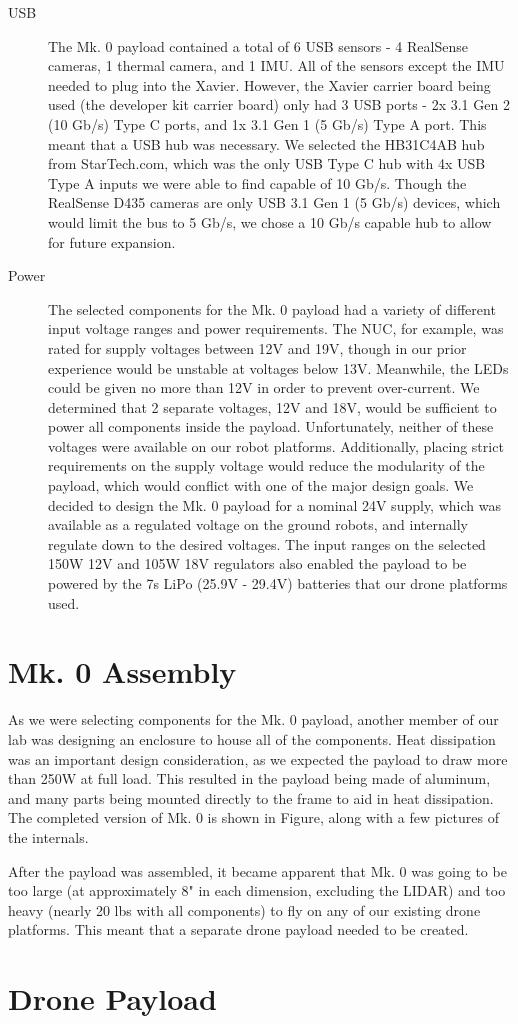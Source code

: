 \begin{description}
	\item[USB] The Mk. 0 payload contained a total of 6 USB sensors - 4 RealSense cameras, 1 thermal camera, and 1 IMU. All of the sensors except the IMU needed to plug into the Xavier. However, the Xavier carrier board being used (the developer kit carrier board) only had 3 USB ports - 2x 3.1 Gen 2 (10 Gb/s) Type C ports, and 1x 3.1 Gen 1 (5 Gb/s) Type A port. This meant that a USB hub was necessary. We selected the HB31C4AB hub from StarTech.com, which was the only USB Type C hub with 4x USB Type A inputs we were able to find capable of 10 Gb/s. Though the RealSense D435 cameras are only USB 3.1 Gen 1 (5 Gb/s) devices, which would limit the bus to 5 Gb/s, we chose a 10 Gb/s capable hub to allow for future expansion.
	
	\item[Power] The selected components for the Mk. 0 payload had a variety of different input voltage ranges and power requirements. The NUC, for example, was rated for supply voltages between 12V and 19V, though in our prior experience would be unstable at voltages below 13V. Meanwhile, the LEDs could be given no more than 12V in order to prevent over-current. We determined that 2 separate voltages, 12V and 18V, would be sufficient to power all components inside the payload. Unfortunately, neither of these voltages were available on our robot platforms. Additionally, placing strict requirements on the supply voltage would reduce the modularity of the payload, which would conflict with one of the major design goals. We decided to design the Mk. 0 payload for a nominal 24V supply, which was available as a regulated voltage on the ground robots, and internally regulate down to the desired voltages. The input ranges on the selected 150W 12V and 105W 18V regulators also enabled the payload to be powered by the 7s LiPo (25.9V - 29.4V) batteries that our drone platforms used.
	
\end{description}

\section{Mk. 0 Assembly}

As we were selecting components for the Mk. 0 payload, another member of our lab was designing an enclosure to house all of the components. Heat dissipation was an important design consideration, as we expected the payload to draw more than 250W at full load. This resulted in the payload being made of aluminum, and many parts being mounted directly to the frame to aid in heat dissipation. The completed version of Mk. 0 is shown in Figure, along with a few pictures of the internals.

After the payload was assembled, it became apparent that Mk. 0 was going to be too large (at approximately 8" in each dimension, excluding the LIDAR) and too heavy (nearly 20 lbs with all components) to fly on any of our existing drone platforms. This meant that a separate drone payload needed to be created.

\section{Drone Payload}